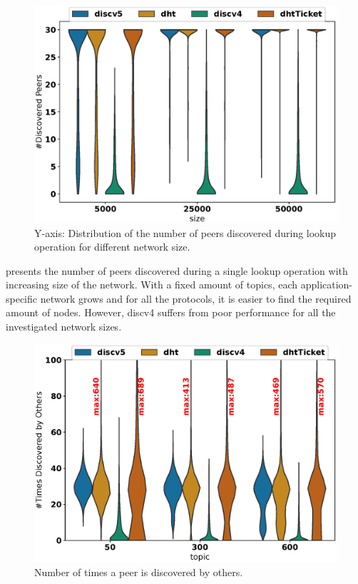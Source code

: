 \begin{figure}[!h]
\includegraphics[width=\linewidth]{results/efficiency/violin_size_discovered.eps}
\caption{Y-axis: Distribution of the number of peers discovered during lookup operation for different network size.}
\label{fig:discoveredPerSize}
\end{figure}

 presents the number of peers discovered during a single lookup operation with increasing size of the network. With a fixed amount of topics, each application-specific network grows and for all the protocols, it is easier to find the required amount of nodes. However, discv4 suffers from poor performance for all the investigated network sizes. 

\begin{figure}
\includegraphics[width=\linewidth]{results/efficiency/violin_topic_wasDiscovered.eps}
\caption{Number of times a peer is discovered by others.}
\label{fig:discoveredByPerTopic}
\end{figure}


